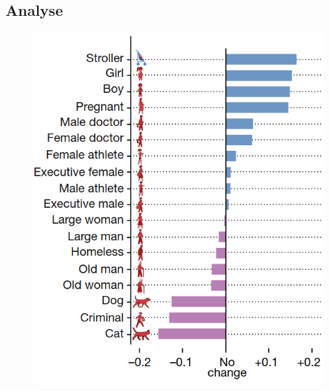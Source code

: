 \documentclass[a4paper, 12pt, openany]{book}
\begin{document}
            \subsection{Analyse}
                \begin{figure}
                    \begin{center}
                        \includegraphics[scale=0.35]{mitstat.png} 
                    \end{center}
                    \caption{\cite{fig_mitstat}}
                    \label{fig_mitstat}
                \end{figure}
\end{document}
